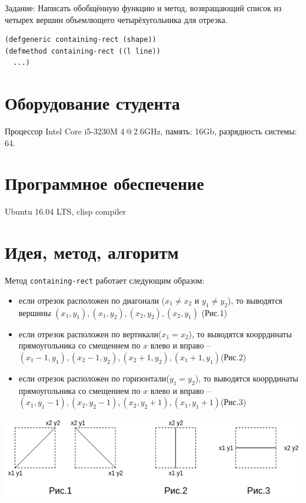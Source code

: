 \documentclass[12pt]{article}
\begin{document}
Задание: Написать обобщённую функцию и метод, возвращающий список из четырех вершин объемлющего четырёхугольника для отрезка.\\

\begin{lstlisting}
(defgeneric containing-rect (shape))
(defmethod containing-rect ((l line))
  ...)
\end{lstlisting}

\section{Оборудование студента}
Процессор Intel Core i5-3230M 4\,@\,2.6GHz, память: 16Gb, разрядность системы: 64.

\section{Программное обеспечение}
Ubuntu 16.04 LTS, clisp compiler

\section{Идея, метод, алгоритм}
Метод {\tt containing-rect} работает следующим образом:
\begin{itemize}
\setlength{\itemsep}{-1mm} %
\item если отрезок расположен по диагонали ($x_1 \neq x_2$ и $y_1 \neq y_2$), то выводятся вершины $(x_1, y_1), (x_1, y_2), (x_2, y_2), (x_2, y_1)$ (Рис.1)

\item если отрезок расположен по вертикали($x_1 = x_2$), то выводятся кооррдинаты прямоугольника со смещением по $x$ влево и вправо -- $(x_1 - 1, y_1), (x_2 - 1, y_2), (x_2 + 1, y_2), (x_1 + 1, y_1)$(Рис.2)

\item если отрезок расположен по горизонтали($y_1 = y_2$), то выводятся кооррдинаты прямоугольника со смещением по $x$ влево и вправо -- $(x_1, y_1 - 1), (x_2, y_2 - 1), (x_2, y_2 + 1), (x_1, y_1 + 1)$(Рис.3)
\end{itemize}

\includegraphics[scale=0.5]{pic.png}
\end{document}
